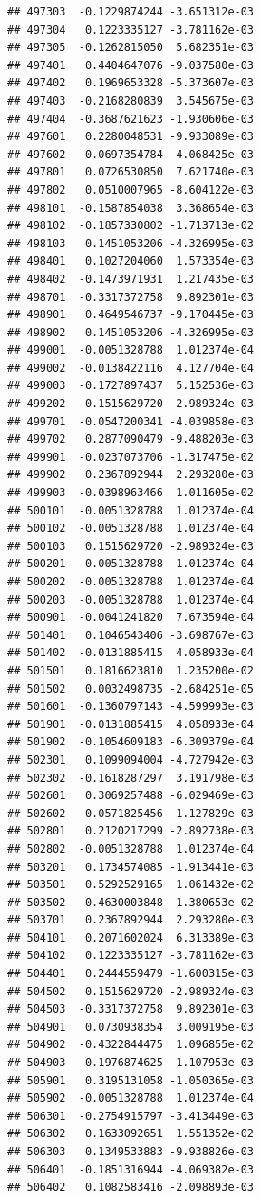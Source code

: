 \begin{frame}[fragile]
\begin{verbatim}
## 497303  -0.1229874244 -3.651312e-03
## 497304   0.1223335127 -3.781162e-03
## 497305  -0.1262815050  5.682351e-03
## 497401   0.4404647076 -9.037580e-03
## 497402   0.1969653328 -5.373607e-03
## 497403  -0.2168280839  3.545675e-03
## 497404  -0.3687621623 -1.930606e-03
## 497601   0.2280048531 -9.933089e-03
## 497602  -0.0697354784 -4.068425e-03
## 497801   0.0726530850  7.621740e-03
## 497802   0.0510007965 -8.604122e-03
## 498101  -0.1587854038  3.368654e-03
## 498102  -0.1857330802 -1.713713e-02
## 498103   0.1451053206 -4.326995e-03
## 498401   0.1027204060  1.573354e-03
## 498402  -0.1473971931  1.217435e-03
## 498701  -0.3317372758  9.892301e-03
## 498901   0.4649546737 -9.170445e-03
## 498902   0.1451053206 -4.326995e-03
## 499001  -0.0051328788  1.012374e-04
## 499002  -0.0138422116  4.127704e-04
## 499003  -0.1727897437  5.152536e-03
## 499202   0.1515629720 -2.989324e-03
## 499701  -0.0547200341 -4.039858e-03
## 499702   0.2877090479 -9.488203e-03
## 499901  -0.0237073706 -1.317475e-02
## 499902   0.2367892944  2.293280e-03
## 499903  -0.0398963466  1.011605e-02
## 500101  -0.0051328788  1.012374e-04
## 500102  -0.0051328788  1.012374e-04
## 500103   0.1515629720 -2.989324e-03
## 500201  -0.0051328788  1.012374e-04
## 500202  -0.0051328788  1.012374e-04
## 500203  -0.0051328788  1.012374e-04
## 500901  -0.0041241820  7.673594e-04
## 501401   0.1046543406 -3.698767e-03
## 501402  -0.0131885415  4.058933e-04
## 501501   0.1816623810  1.235200e-02
## 501502   0.0032498735 -2.684251e-05
## 501601  -0.1360797143 -4.599993e-03
## 501901  -0.0131885415  4.058933e-04
## 501902  -0.1054609183 -6.309379e-04
## 502301   0.1099094004 -4.727942e-03
## 502302  -0.1618287297  3.191798e-03
## 502601   0.3069257488 -6.029469e-03
## 502602  -0.0571825456  1.127829e-03
## 502801   0.2120217299 -2.892738e-03
## 502802  -0.0051328788  1.012374e-04
## 503201   0.1734574085 -1.913441e-03
## 503501   0.5292529165  1.061432e-02
## 503502   0.4630003848 -1.380653e-02
## 503701   0.2367892944  2.293280e-03
## 504101   0.2071602024  6.313389e-03
## 504102   0.1223335127 -3.781162e-03
## 504401   0.2444559479 -1.600315e-03
## 504502   0.1515629720 -2.989324e-03
## 504503  -0.3317372758  9.892301e-03
## 504901   0.0730938354  3.009195e-03
## 504902  -0.4322844475  1.096855e-02
## 504903  -0.1976874625  1.107953e-03
## 505901   0.3195131058 -1.050365e-03
## 505902  -0.0051328788  1.012374e-04
## 506301  -0.2754915797 -3.413449e-03
## 506302   0.1633092651  1.551352e-02
## 506303   0.1349533883 -9.938826e-03
## 506401  -0.1851316944 -4.069382e-03
## 506402   0.1082583416 -2.098893e-03

\end{verbatim}
\end{frame}
